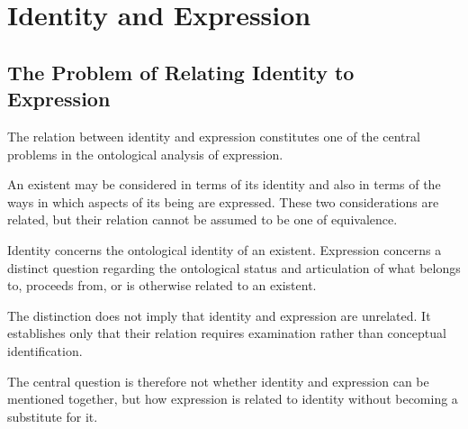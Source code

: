 %
%

\section{Identity and Expression}
\label{sec:identity-and-expression}

\subsection{The Problem of Relating Identity to Expression}

The relation between identity and expression constitutes
one of the central problems in the ontological analysis
of expression.

An existent may be considered in terms of its identity
and also in terms of the ways in which aspects of its
being are expressed. These two considerations are
related, but their relation cannot be assumed to be
one of equivalence.

Identity concerns the ontological identity of an existent.
Expression concerns a distinct question regarding the
ontological status and articulation of what belongs to,
proceeds from, or is otherwise related to an existent.

The distinction does not imply that identity and expression
are unrelated. It establishes only that their relation
requires examination rather than conceptual identification.

The central question is therefore not whether identity
and expression can be mentioned together, but how
expression is related to identity without becoming
a substitute for it.

